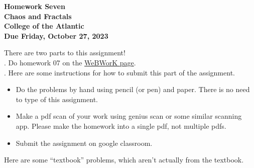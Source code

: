 \documentclass[12pt]{article}
\begin{document}
\pagestyle{empty}
 
\begin{center}
{\LARGE {\bf Homework Seven}}\\
\bigskip
{\Large {\bf Chaos and Fractals}}\\
\bigskip
{\Large {\bf College of the Atlantic}}\\
\bigskip
{ {\bf Due Friday, October 27, 2023}}\\  
\end{center}
\medskip

\noindent There are two parts to this assignment!\\

. Do homework 07 on the 
\href{https://webwork-hosting.runestone.academy/webwork2/coa-feldman-es1026i-fall2023}{WeBWorK
  page}.\\

.  Here are some
instructions for how to submit this part of the assignment. 
\begin{itemize}
  \setlength{\itemsep}{-1mm}
\item Do the problems by hand using pencil (or pen) and paper.
  There is no need to type of this assignment.
\item Make a pdf scan of your work using genius scan or some
  similar scanning app.  Please make the homework into a single
  pdf, not multiple pdfs.
\item Submit the assignment on google classroom. %
\end{itemize}
\smallskip
\noindent Here are some ``textbook'' problems, which aren't actually
from the textbook.
\end{document}
